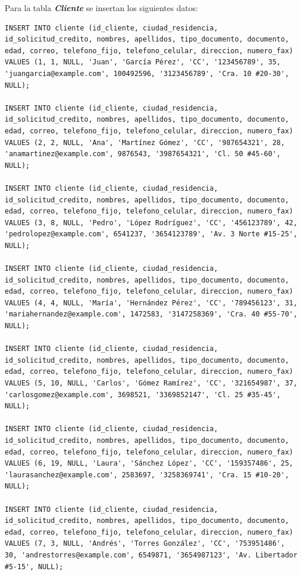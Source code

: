 \documentclass{article}
\begin{document}
Para la tabla \textit{\textbf{Cliente}} se insertan los siguientes datos:
\begin{lstlisting}
INSERT INTO cliente (id_cliente, ciudad_residencia, id_solicitud_credito, nombres, apellidos, tipo_documento, documento, edad, correo, telefono_fijo, telefono_celular, direccion, numero_fax)
VALUES (1, 1, NULL, 'Juan', 'García Pérez', 'CC', '123456789', 35, 'juangarcia@example.com', 100492596, '3123456789', 'Cra. 10 #20-30', NULL);

INSERT INTO cliente (id_cliente, ciudad_residencia, id_solicitud_credito, nombres, apellidos, tipo_documento, documento, edad, correo, telefono_fijo, telefono_celular, direccion, numero_fax)
VALUES (2, 2, NULL, 'Ana', 'Martínez Gómez', 'CC', '987654321', 28, 'anamartinez@example.com', 9876543, '3987654321', 'Cl. 50 #45-60', NULL);

INSERT INTO cliente (id_cliente, ciudad_residencia, id_solicitud_credito, nombres, apellidos, tipo_documento, documento, edad, correo, telefono_fijo, telefono_celular, direccion, numero_fax)
VALUES (3, 8, NULL, 'Pedro', 'López Rodríguez', 'CC', '456123789', 42, 'pedrolopez@example.com', 6541237, '3654123789', 'Av. 3 Norte #15-25', NULL);

INSERT INTO cliente (id_cliente, ciudad_residencia, id_solicitud_credito, nombres, apellidos, tipo_documento, documento, edad, correo, telefono_fijo, telefono_celular, direccion, numero_fax)
VALUES (4, 4, NULL, 'María', 'Hernández Pérez', 'CC', '789456123', 31, 'mariahernandez@example.com', 1472583, '3147258369', 'Cra. 40 #55-70', NULL);

INSERT INTO cliente (id_cliente, ciudad_residencia, id_solicitud_credito, nombres, apellidos, tipo_documento, documento, edad, correo, telefono_fijo, telefono_celular, direccion, numero_fax)
VALUES (5, 10, NULL, 'Carlos', 'Gómez Ramírez', 'CC', '321654987', 37, 'carlosgomez@example.com', 3698521, '3369852147', 'Cl. 25 #35-45', NULL);

INSERT INTO cliente (id_cliente, ciudad_residencia, id_solicitud_credito, nombres, apellidos, tipo_documento, documento, edad, correo, telefono_fijo, telefono_celular, direccion, numero_fax)
VALUES (6, 19, NULL, 'Laura', 'Sánchez López', 'CC', '159357486', 25, 'laurasanchez@example.com', 2583697, '3258369741', 'Cra. 15 #10-20', NULL);

INSERT INTO cliente (id_cliente, ciudad_residencia, id_solicitud_credito, nombres, apellidos, tipo_documento, documento, edad, correo, telefono_fijo, telefono_celular, direccion, numero_fax)
VALUES (7, 3, NULL, 'Andrés', 'Torres González', 'CC', '753951486', 30, 'andrestorres@example.com', 6549871, '3654987123', 'Av. Libertador #5-15', NULL);


\end{lstlisting}
\end{document}
